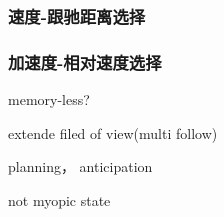 \subsubsection{速度-跟驰距离选择}

\subsubsection{加速度-相对速度选择}

memory-less?

extende filed of view(multi follow)

planning， anticipation

not myopic state






